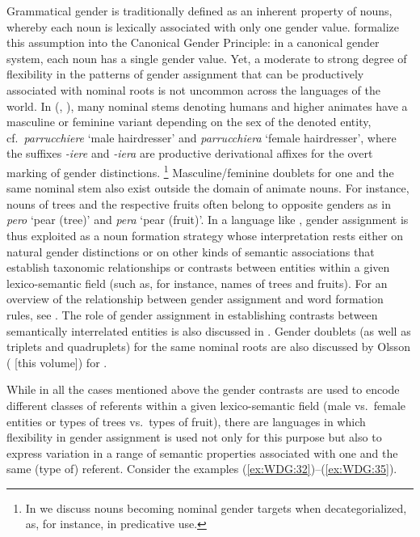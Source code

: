 \documentclass[output=collectionpaper]{langsci/langscibook}
\begin{document}
Grammatical gender is traditionally defined as an inherent property of nouns, whereby each noun is lexically associated with only one gender value. \cite[9]{Corbett2016} formalize this assumption into the Canonical Gender Principle: in a canonical gender system, each noun has a single gender value. Yet, a moderate to strong degree of flexibility in the patterns of gender assignment that can be productively associated with nominal roots is not uncommon across the languages of the world. In  (, ), many nominal stems denoting humans and higher animates have a masculine or feminine variant depending on the sex of the denoted entity, cf.\ \textit{parrucchiere} `male hairdresser' and \textit{parrucchiera} `female hairdresser', where the suffixes \textit{-iere} and \textit{-iera} are productive derivational affixes for the overt marking of gender distinctions.%
\footnote{%
In  we discuss nouns becoming nominal gender targets when decategorialized, as, for instance, in predicative use.
} %
Masculine/feminine doublets for one and the same nominal stem also exist outside the domain of animate nouns. For instance, nouns of trees and the respective fruits often belong to opposite genders as in \textit{pero} `pear (tree)' and \textit{pera} `pear (fruit)'. In a language like , gender assignment is thus exploited as a noun formation strategy whose interpretation rests either on natural gender distinctions or on other kinds of semantic associations that establish taxonomic relationships or contrasts between entities within a given lexico-semantic field (such as, for instance, names of trees and fruits). For an overview of the relationship between gender assignment and word formation rules, see \cite{Contini-Morava2013}. The role of gender assignment in establishing contrasts between semantically interrelated entities is also discussed in . Gender doublets (as well as triplets and quadruplets) for the same nominal roots are also discussed by Olsson (\citealt*[]{Olssonthisyear} [this volume]) for .

While in all the cases mentioned above the gender contrasts are used to encode different classes of referents within a given lexico-semantic field (male vs.\ female entities or types of trees vs.\ types of fruit), there are languages in which flexibility in gender assignment is used not only for this purpose but also to express variation in a range of semantic properties associated with one and the same (type of) referent. Consider the examples (\ref{ex:WDG:32})--(\ref{ex:WDG:35}).
\end{document}
